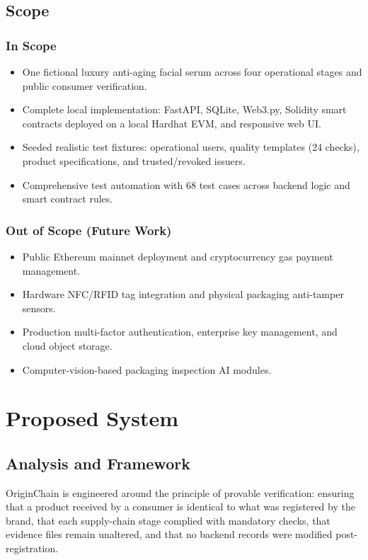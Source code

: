 \documentclass[12pt,a4paper]{report}
\begin{document}
\section{Scope}
\subsection{In Scope}
\begin{itemize}[leftmargin=1.8em, itemsep=3pt, parsep=0pt]
    \item One fictional luxury anti-aging facial serum across four operational stages and public consumer verification.
    \item Complete local implementation: FastAPI, SQLite, Web3.py, Solidity smart contracts deployed on a local Hardhat EVM, and responsive web UI.
    \item Seeded realistic test fixtures: operational users, quality templates (24 checks), product specifications, and trusted/revoked issuers.
    \item Comprehensive test automation with 68 test cases across backend logic and smart contract rules.
\end{itemize}

\subsection{Out of Scope (Future Work)}
\begin{itemize}[leftmargin=1.8em, itemsep=3pt, parsep=0pt]
    \item Public Ethereum mainnet deployment and cryptocurrency gas payment management.
    \item Hardware NFC/RFID tag integration and physical packaging anti-tamper sensors.
    \item Production multi-factor authentication, enterprise key management, and cloud object storage.
    \item Computer-vision-based packaging inspection AI modules.
\end{itemize}

\chapter{Proposed System}

\section{Analysis and Framework}
OriginChain is engineered around the principle of provable verification: ensuring that a product received by a consumer is identical to what was registered by the brand, that each supply-chain stage complied with mandatory checks, that evidence files remain unaltered, and that no backend records were modified post-registration.
\end{document}
